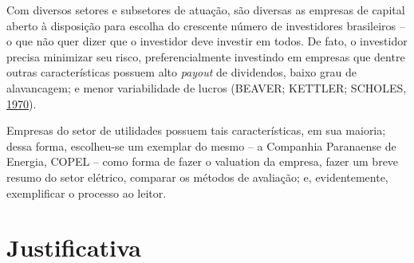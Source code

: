 \documentclass[grad,numbers]{coppe}
\begin{document}
  Com diversos setores e subsetores de atuação, são diversas as empresas de capital aberto à disposição para escolha do crescente número de investidores brasileiros -- o que não quer dizer que o investidor deve investir em todos. De fato, o investidor precisa minimizar seu risco, preferencialmente investindo em empresas que dentre outras características possuem alto \emph{payout} de dividendos, baixo grau de alavancagem; e menor variabilidade de lucros (BEAVER; KETTLER; SCHOLES, \protect\hyperlink{ref-beaver1970}{1970}).

  Empresas do setor de utilidades possuem tais características, em sua maioria; dessa forma, escolheu-se um exemplar do mesmo -- a Companhia Paranaense de Energia, COPEL -- como forma de fazer o valuation da empresa, fazer um breve resumo do setor elétrico, comparar os métodos de avaliação; e, evidentemente, exemplificar o processo ao leitor.

  \hypertarget{justificativa}{%
  \section{Justificativa}\label{justificativa}}
\end{document}
